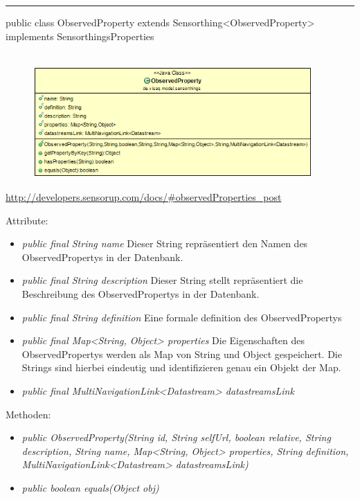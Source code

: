 \rule{\textwidth}{0.4pt}
public class ObservedProperty extends Sensorthing<ObservedProperty> implements SensorthingsProperties
\\\\
\begin{minipage}{0.4\textwidth}
    \begin{figure}[H]
        {\centering\includegraphics[width=0.95\textwidth]{media/backend/modell/classes/ObservedProperty.png}}
    \end{figure}
    \end{minipage} \hfill
\begin{minipage}{0.6\textwidth}
    \url{http://developers.sensorup.com/docs/#observedProperties_post}
\end{minipage}

Attribute:
\begin{itemize}
    \item \emph{public final String name} Dieser String repräsentiert den Namen des ObservedPropertys in der Datenbank.
    \item \emph{public final String description} Dieser String stellt repräsentiert die Beschreibung des ObservedPropertys in der Datenbank.
    \item \emph{public final String definition} Eine formale definition des ObservedPropertys
    \item \emph{public final Map<String, Object> properties} Die Eigenschaften des ObservedPropertys werden als Map von String und Object gespeichert. Die Strings sind hierbei eindeutig und identifizieren genau ein Objekt der Map.
    \item \emph{public final MultiNavigationLink<Datastream> datastreamsLink} 
\end{itemize}
Methoden:
\begin{itemize}
    \item \emph{public ObservedProperty(String id, String selfUrl, boolean relative, String description, String name, Map<String, Object> properties, String definition, MultiNavigationLink<Datastream> datastreamsLink)}
    \item \emph{public boolean equals(Object obj)} 
\end{itemize}

